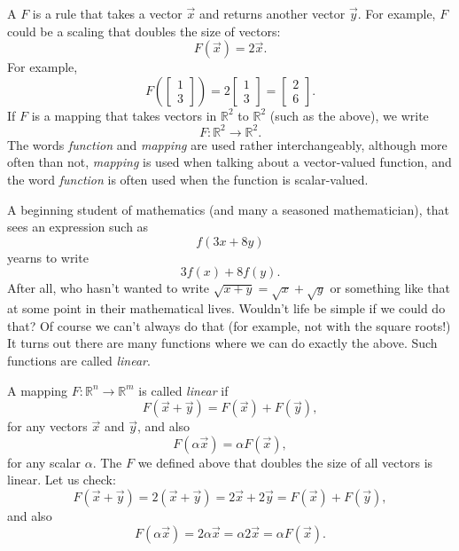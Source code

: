 A \emph{}
$F$ is a rule that takes a vector $\vec{x}$ and returns another vector
$\vec{y}$.  For example, $F$ could be a scaling that doubles the size of
vectors:
\begin{equation*}
F(\vec{x}) = 2 \vec{x} .
\end{equation*}
For example,
\begin{equation*}
F
\left( \begin{bmatrix} 1 \\ 3 \end{bmatrix} \right)
=
2
\begin{bmatrix} 1 \\ 3 \end{bmatrix}
=
\begin{bmatrix} 2 \\ 6 \end{bmatrix} .
\end{equation*}
If $F$ is a mapping that takes vectors in
${\mathbb R}^2$ to 
${\mathbb R}^2$ (such as the above), we write
\begin{equation*}
F \colon {\mathbb R}^2 \to {\mathbb R}^2 .
\end{equation*}
The words \emph{function} and \emph{mapping} are used rather interchangeably,
although more often than not, \emph{mapping} is used when talking about a
vector-valued function, and the word \emph{function} is often used when the
function is scalar-valued.

A beginning student of mathematics (and many a seasoned mathematician),
that
sees an expression such as
\begin{equation*}
f(3x+8y)
\end{equation*}
yearns to write
\begin{equation*}
3f(x)+8f(y) .
\end{equation*}
After all, who hasn't wanted to write $\sqrt{x+y} = \sqrt{x} + \sqrt{y}$ or
something like that at some point in their mathematical lives.
Wouldn't life be simple if we could do that?
Of course we can't always do that (for example, not with the square roots!)
It turns out there are many functions where
we can do exactly the above.  Such functions are called \emph{linear}.

A mapping $F \colon {\mathbb R}^n \to {\mathbb R}^m$
is called \emph{linear} if
\begin{equation*}
F(\vec{x}+\vec{y}) = F(\vec{x})+F(\vec{y}),
\end{equation*}
for any vectors $\vec{x}$ and $\vec{y}$,
and also
\begin{equation*}
F(\alpha \vec{x}) = \alpha F(\vec{x}) ,
\end{equation*}
for any scalar $\alpha$.
The $F$ we defined above that doubles the size of all vectors is linear.  Let
us check:
\begin{equation*}
F(\vec{x}+\vec{y})
=
2(\vec{x}+\vec{y})
=
2\vec{x}+2\vec{y}
=
F(\vec{x})+F(\vec{y}) ,
\end{equation*}
and also
\begin{equation*}
F(\alpha \vec{x}) = 2 \alpha \vec{x} = \alpha 2 \vec{x} = \alpha F(\vec{x}) .
\end{equation*}

